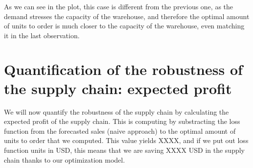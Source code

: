 \documentclass{OptiFlow}
\begin{document}
As we can see in the plot, this case is different from the previous one, as the demand stresses the capacity of the warehouse,
and therefore the optimal amount of units to order is much closer to the capacity of the warehouse, even matching it in the last observation.

\section{Quantification of the robustness of the supply chain: expected profit}
We will now quantify the robustness of the supply chain by calculating the expected profit of the supply chain.
This is computing by substracting the loss function from the forecasted sales (naive approach) to the optimal amount of units to order that we computed.
This value yields XXXX, and if we put out loss function units in USD, this means that we are saving XXXX USD in the supply chain thanks to our optimization model.
\end{document}
